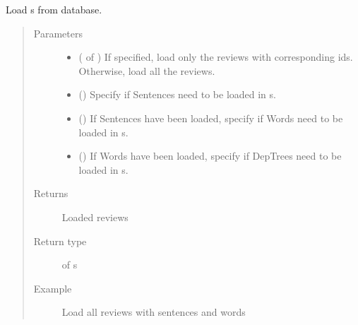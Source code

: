 \documentclass[letterpaper,10pt,english]{sphinxmanual}
\begin{document}
\begin{fulllineitems}
\label{\detokenize{index:loacore.load.review_load.load_reviews}}
Load  s from database.
\begin{quote}\begin{description}
\item[{Parameters}] \leavevmode\begin{itemize}
\item {} 
 ( of ) \textendash{} If specified, load only the reviews with corresponding ids. Otherwise, load all the reviews.

\item {} 
 () \textendash{} Specify if Sentences need to be loaded in  s.

\item {} 
 () \textendash{} If Sentences have been loaded, specify if Words need to be loaded in  s.

\item {} 
 () \textendash{} If Words have been loaded, specify if DepTrees need to be loaded in  s.

\end{itemize}

\item[{Returns}] \leavevmode
Loaded reviews

\item[{Return type}] \leavevmode
{} of  s

\item[{Example}] \leavevmode
Load all reviews with sentences and words


\end{description}
\end{quote}
\end{fulllineitems}
\end{document}
